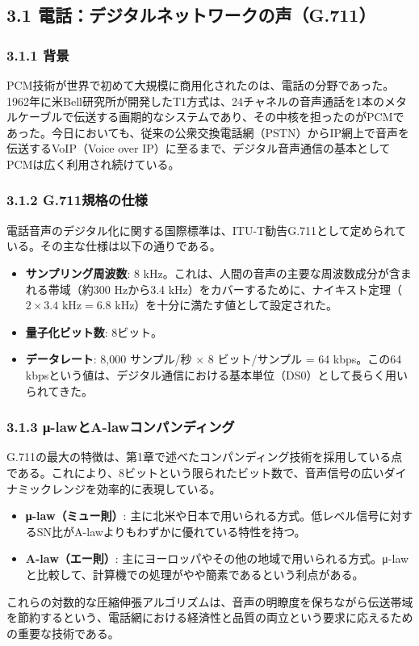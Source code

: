 \documentclass[
  a4paper,  %
  11pt,     %
]{ltjsarticle}%
\begin{document}
\subsection{3.1 電話：デジタルネットワークの声（G.711）}

\subsubsection{3.1.1 背景}

PCM技術が世界で初めて大規模に商用化されたのは、電話の分野であった。1962年に米Bell研究所が開発したT1方式は、24チャネルの音声通話を1本のメタルケーブルで伝送する画期的なシステムであり、その中核を担ったのがPCMであった\cite{ref1}。今日においても、従来の公衆交換電話網（PSTN）からIP網上で音声を伝送するVoIP（Voice over IP）に至るまで、デジタル音声通信の基本としてPCMは広く利用され続けている\cite{ref11}。

\subsubsection{3.1.2 G.711規格の仕様}

電話音声のデジタル化に関する国際標準は、ITU-T勧告G.711として定められている。その主な仕様は以下の通りである\cite{ref11}。
\begin{itemize}
    \item \textbf{サンプリング周波数}: 8 kHz。これは、人間の音声の主要な周波数成分が含まれる帯域（約300 Hzから3.4 kHz）をカバーするために、ナイキスト定理（$2 \times 3.4 \text{ kHz} = 6.8 \text{ kHz}$）を十分に満たす値として設定された。
    \item \textbf{量子化ビット数}: 8ビット。
    \item \textbf{データレート}: 8,000 サンプル/秒 $\times$ 8 ビット/サンプル = 64 kbps。この64 kbpsという値は、デジタル通信における基本単位（DS0）として長らく用いられてきた。
\end{itemize}

\subsubsection{3.1.3 μ-lawとA-lawコンパンディング}

G.711の最大の特徴は、第1章で述べたコンパンディング技術を採用している点である。これにより、8ビットという限られたビット数で、音声信号の広いダイナミックレンジを効率的に表現している。
\begin{itemize}
    \item \textbf{μ-law（ミュー則）}: 主に北米や日本で用いられる方式。低レベル信号に対するSN比がA-lawよりもわずかに優れている特性を持つ\cite{ref11}。
    \item \textbf{A-law（エー則）}: 主にヨーロッパやその他の地域で用いられる方式。μ-lawと比較して、計算機での処理がやや簡素であるという利点がある\cite{ref11}。
\end{itemize}
これらの対数的な圧縮伸張アルゴリズムは、音声の明瞭度を保ちながら伝送帯域を節約するという、電話網における経済性と品質の両立という要求に応えるための重要な技術である。
\end{document}
